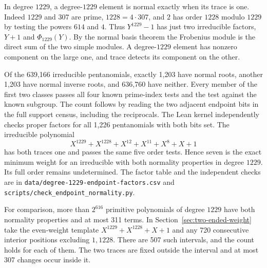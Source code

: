 \documentclass[11pt]{article}
\begin{document}
In degree \(1229\), a degree-\(1229\) element is normal exactly when
its trace is one. Indeed \(1229\) and \(307\) are prime,
\(1228=4\cdot307\), and \(2\) has order \(1228\) modulo \(1229\)
by testing the powers \(614\) and \(4\). Thus \(Y^{1229}-1\)
has just two irreducible factors, \(Y+1\) and \(\Phi_{1229}(Y)\).
By the normal basis theorem the Frobenius module is the direct sum of
the two simple modules. A degree-\(1229\) element has nonzero component
on the large one, and trace detects its component on the other.

Of the 639,166 irreducible pentanomials, exactly 1,203 have normal
roots, another 1,203 have normal inverse roots, and 636,760 have
neither. Every member of the first two classes passes all four known
prime-index tests and the test against the known subgroup. The count
follows by reading the two adjacent endpoint bits in the full support
census, including the reciprocals. The Lean kernel independently
checks proper factors for all 1,226 pentanomials with both bits set.
The irreducible polynomial
\[
   X^{1229}+X^{1228}+X^{12}+X^{11}+X^8+X+1
\]
has both traces one and passes the same five order tests. Hence seven
is the exact minimum weight for an irreducible with both normality
properties in degree \(1229\). Its full order remains undetermined.
The factor table and the independent checks are in
\nolinkurl{data/degree-1229-endpoint-factors.csv} and
\nolinkurl{scripts/check_endpoint_normality.py}.

For comparison, more than \(2^{616}\) primitive polynomials of degree
\(1229\) have both normality properties and at most 311 terms.
In Section~\ref{sec:two-ended-weight} take the even-weight template
\(X^{1229}+X^{1228}+X+1\) and any 720 consecutive interior positions
excluding \(1,1228\). There are 507 such intervals, and the count holds
for each of them. The two traces are fixed outside the interval and
at most 307 changes occur inside it.
\end{document}
